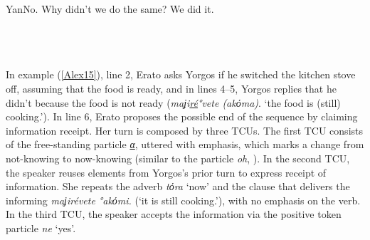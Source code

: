 \documentclass[output=paper]{LSP/langsci}
\begin{document}
\begin{Transcript}[FS {>}{>\hspace{0.2in}}]{Yan}{No. Why didn’t we do the same? We did it.}%
\label{Alex14}%
\\
\\
\\
\\ 
\end{Transcript}


In example (\ref{Alex15}), line 2, Erato asks Yorgos if he switched the kitchen stove off, assuming that the food is ready, and in lines 4--5, Yorgos replies that he didn’t because the food is not ready (\textit{maʝi\underline{ré}°vete (akόma)}. `the food is (still) cooking.'). In line 6, Erato proposes the possible end of the sequence by claiming information receipt. Her turn is composed by three TCUs. The first TCU consists of the free-standing particle \textit{\underline{α}}, uttered with emphasis, which marks a change from not-knowing to now-knowing (similar to the  particle \textit{oh}, \citealt{heritage1984}). In the second TCU, the speaker reuses elements from Yorgos’s prior turn to express receipt of information. She repeats the adverb \textit{tόra} `now' and the clause that delivers the informing \textit{maʝirévete °akόmi.} (`it is still cooking.'), with no emphasis on the verb. In the third TCU, the speaker accepts the information via the positive token particle \textit{ne} `yes'. 
\end{document}

